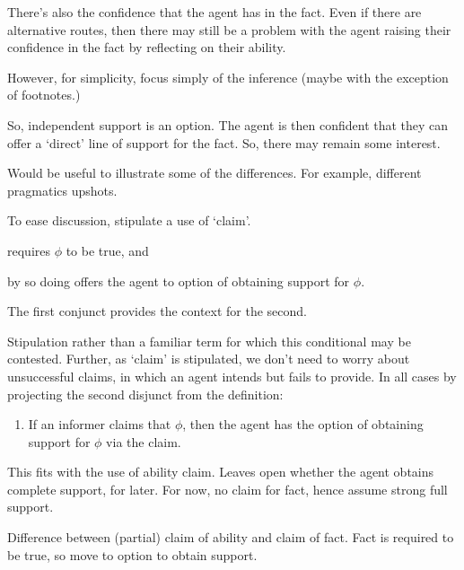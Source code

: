 \documentclass[10pt]{article}
\begin{document}
\begin{note}
  There's also the confidence that the agent has in the fact.
  Even if there are alternative routes, then there may still be a problem with the agent raising their confidence in the fact by reflecting on their ability.

  However, for simplicity, focus simply of the inference (maybe with the exception of footnotes.)
\end{note}

\begin{note}
  So, independent support is an option.
  The agent is then confident that they can offer a `direct' line of support for the fact.
  So, there may remain some interest.

  Would be useful to illustrate some of the differences.
  For example, different pragmatics upshots.
\end{note}

\newpage

\begin{note}
  To ease discussion, stipulate a use of `claim'.
\begin{enumerate*}[label=\roman*)]
\item requires \(\phi\) to be true, and \item by so doing offers the agent to option of obtaining support for \(\phi\).
\end{enumerate*}
The first conjunct provides the context for the second.

Stipulation rather than a familiar term for which this conditional may be contested.
Further, as `claim' is stipulated, we don't need to worry about unsuccessful claims, in which an agent intends but fails to provide.
In all cases by projecting the second disjunct from the definition:
\begin{enumerate}
\item\label{cond:claim-to-opt-supp} If an informer claims that \(\phi\), then the agent has the option of obtaining support for \(\phi\) via the claim.
\end{enumerate}

This fits with the use of ability claim.
Leaves open whether the agent obtains complete support, for later.
For now, no claim for fact, hence assume strong full support.

Difference between (partial) claim of ability and claim of fact.
Fact is required to be true, so move to option to obtain support.
\end{note}
\end{document}
